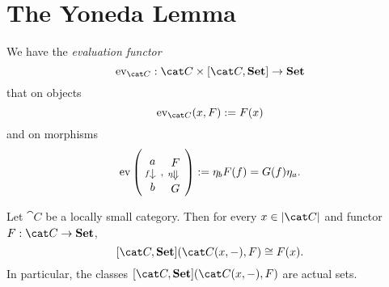 
\section{The Yoneda Lemma}

We have the {\em evaluation functor}
\[\ev_{\cat C} : \cat C \times [\cat C, \Set] \to \Set\]
that on objects
\[\ev_{\cat C}(x, F) := F(x)\]
and on morphisms
\[\ev\left(\begin{tikzcd}[row sep=small] a \ar["f", d, swap] \\ b \end{tikzcd}, \begin{tikzcd}[row sep=small] F \ar["\eta", d, swap, Rightarrow] \\ G \end{tikzcd}\right) := \eta_b F(f) = G(f) \eta_a .\]

\begin{lemma}\label{lemma:YonedaLemmaLemma}
Let \(\cat C\) be a locally small category. Then for every \(x \in \obj{\cat C}\) and functor \(F : \cat C \to \Set\),
\[[\cat C, \Set](\cat C(x, -), F) \cong F(x) .\]
In particular, the classes \([\cat C, \Set](\cat C(x, -), F)\) are  actual sets.
\end{lemma}

